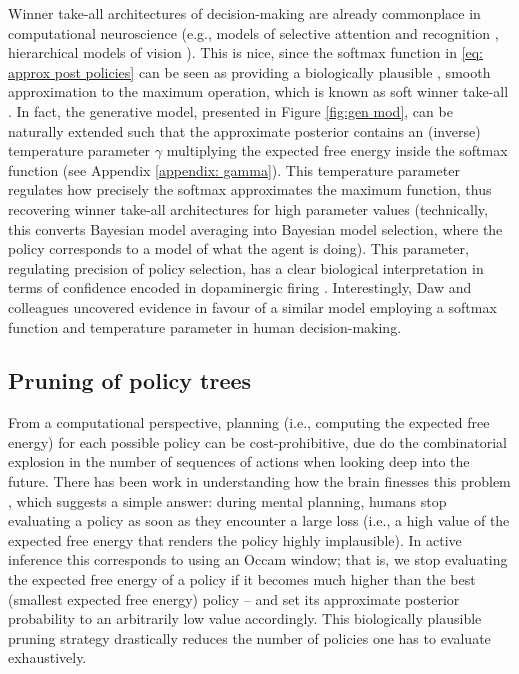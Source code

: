 \documentclass[review,12pt,authoryear]{elsarticle}
\begin{document}
Winner take-all architectures of decision-making are already commonplace in computational neuroscience (e.g., models of selective attention and recognition \citep{carpenterMassivelyParallelArchitecture1987,ittiModelSaliencybasedVisual1998}, hierarchical models of vision \citep{riesenhuberHierarchicalModelsObject1999}).
This is nice, since the softmax function in \eqref{eq: approx post policies} can be seen as providing a biologically plausible \citep{marreirosPopulationDynamicsVariance2008,decoDynamicBrainSpiking2008,moranNeuralMassesFields2013}, smooth approximation to the maximum operation, which is known as soft winner take-all \citep{maassComputationalPowerWinnerTakeAll2000}. In fact, the generative model, presented in Figure \ref{fig:gen mod}, can be naturally extended such that the approximate posterior contains an (inverse) temperature parameter $\gamma$ multiplying the expected free energy inside the softmax function (see Appendix \ref{appendix: gamma}). This temperature parameter regulates how precisely the softmax approximates the maximum function, thus recovering winner take-all architectures for high parameter values (technically, this converts Bayesian model averaging into Bayesian model selection, where the policy corresponds to a model of what the agent is doing). This parameter, regulating precision of policy selection, has a clear biological interpretation in terms of confidence encoded in dopaminergic firing \citep{fitzgeraldDopamineRewardLearning2015,fristonAnatomyChoiceDopamine2014,schwartenbeckDopaminergicMidbrainEncodes2015,fristonActiveInferenceProcess2017}. Interestingly, Daw and colleagues \citep{dawCorticalSubstratesExploratory2006} uncovered evidence in favour of a similar model employing a softmax function and temperature parameter in human decision-making.

\subsection{Pruning of policy trees}

From a computational perspective, planning (i.e., computing the expected free energy) for each possible policy can be cost-prohibitive, due do the combinatorial explosion in the number of sequences of actions when looking deep into the future. There has been work in understanding how the brain finesses this problem \citep{huysBonsaiTreesYour2012}, which suggests a simple answer: during mental planning, humans stop evaluating a policy as soon as they encounter a large loss (i.e., a high value of the expected free energy that renders the policy highly implausible). In active inference this corresponds to using an Occam window; that is, we stop evaluating the expected free energy of a policy if it becomes much higher than the best (smallest expected free energy) policy -- and set its approximate posterior probability to an arbitrarily low value accordingly. This biologically plausible pruning strategy drastically reduces the number of policies one has to evaluate exhaustively.
\end{document}
